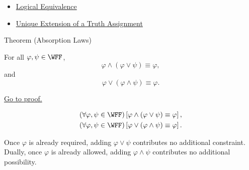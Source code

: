 \begin{dependencies}
\begin{itemize}
  \item \hyperref[def:logical-equivalence-propositional-logic]{Logical Equivalence}
  \item \hyperref[thm:unique-extension-truth-assignment-propositional-logic]{Unique Extension of a Truth Assignment}
\end{itemize}
\end{dependencies}
\begin{theorembox}{Theorem (Absorption Laws)}
\begin{theorem}
\label{thm:absorption-laws-propositional-logic}
For all \(\varphi,\psi\in\WFF\),
\[
\varphi\land(\varphi\lor\psi)\equiv\varphi,
\]
and
\[
\varphi\lor(\varphi\land\psi)\equiv\varphi.
\]

\noindent\hyperref[prf:absorption-laws-propositional-logic]{Go to proof.}
\end{theorem}
\end{theorembox}
\begin{remark*}
\[
\begin{gathered}
(\forall\varphi,\psi\in\WFF)
\left[
\varphi\land(\varphi\lor\psi)\equiv\varphi
\right],\\
(\forall\varphi,\psi\in\WFF)
\left[
\varphi\lor(\varphi\land\psi)\equiv\varphi
\right].
\end{gathered}
\]
\end{remark*}




\begin{remark*}[Interpretation]
Once \(\varphi\) is already required, adding \(\varphi\lor\psi\) contributes no additional constraint. Dually, once \(\varphi\) is already allowed, adding \(\varphi\land\psi\) contributes no additional possibility.
\end{remark*}

